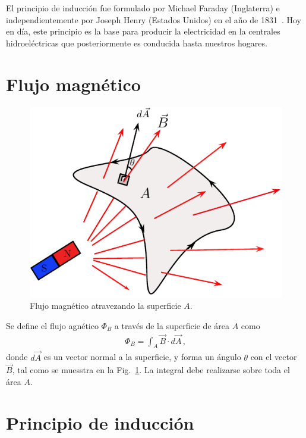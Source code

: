 
El principio de inducción fue formulado por Michael Faraday  (Inglaterra) e independientemente por Joseph Henry (Estados Unidos) en el a\~no de 1831~\cite{}. Hoy en día, este principio es la base para producir la electricidad en la centrales hidroeléctricas que posteriormente es conducida hasta nuestros hogares.

\section{Flujo magnético}

\begin{figure}[h]
\begin{center}
\includegraphics[scale=0.8]{induccionEM/flujoB-definicion.pdf}
\end{center}
\caption{Flujo magnético atravezando la superficie $A$.}
\label{fig:flujoB-def}
\end{figure}
%
Se define el flujo agnético $\Phi_B$ a través de la superficie de área $A$ como
\begin{align}
\Phi_B=\int_A \vec{B}\cdot d\vec{A}\,,
\end{align}
donde $d\vec{A}$ es un vector normal a la superficie, y forma un ángulo $\theta$ con el vector $\vec{B}$, tal como se muesstra en la Fig.~\ref{fig:flujoB-def}. La integral debe realizarse sobre toda el área $A$. 

\section{Principio de inducción}

